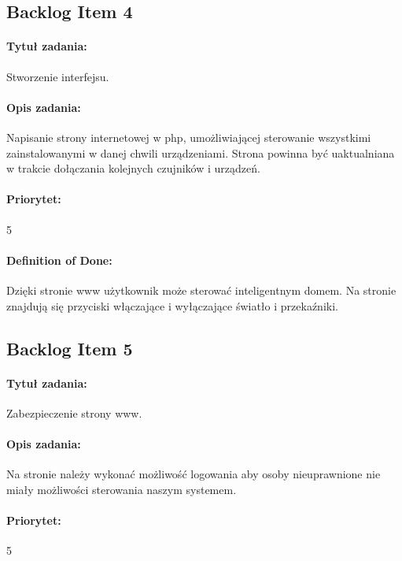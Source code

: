 
	\subsection{Backlog Item 4}
	\paragraph{Tytuł zadania:}
	Stworzenie interfejsu.
	
	\paragraph{Opis zadania:}
	Napisanie strony internetowej w php, umożliwiającej sterowanie wszystkimi zainstalowanymi w danej chwili urządzeniami. Strona powinna być uaktualniana w trakcie dołączania kolejnych czujników i urządzeń.
	
	\paragraph{Priorytet:}
	5
	
	\paragraph{Definition of Done:}
	Dzięki stronie www użytkownik może sterować inteligentnym domem. Na stronie znajdują się przyciski włączające i wyłączające światło i przekaźniki.


\subsection{Backlog Item 5}
\paragraph{Tytuł zadania:}
Zabezpieczenie strony www.

\paragraph{Opis zadania:}
Na stronie należy wykonać możliwość logowania aby osoby nieuprawnione nie miały możliwości sterowania naszym systemem.

\paragraph{Priorytet:}
5

